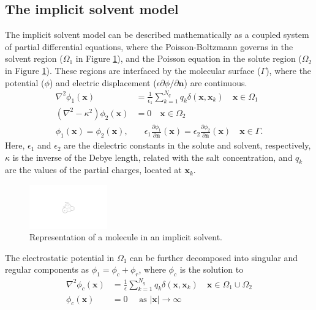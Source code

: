 \subsection*{\sffamily \large The implicit solvent model}

The implicit solvent model\cite{RouxSimonson1999,DecherchiETal2015} can be described mathematically as a coupled system of partial differential equations, where the Poisson-Boltzmann governs in the solvent region ($\Omega_1$ in Figure \ref{fig:implicit_molecule}), and the Poisson equation in the solute region ($\Omega_2$ in Figure \ref{fig:implicit_molecule}). These regions are interfaced by the molecular surface ($\Gamma$), where the potential ($\phi$) and electric displacement ($\epsilon\partial\phi/\partial\mathbf{n}$) are continuous. 
%
\begin{align}\label{eq:pbe}
\nabla^2\phi_1(\mathbf{x}) &= \tfrac{1}{\epsilon_1}\sum_{k=1}^{N_q} q_k\delta(\mathbf{x},\mathbf{x}_k) \quad  \mathbf{x} \in \Omega_1\nonumber\\
\left(\nabla^2 - \kappa^2\right)\phi_2(\mathbf{x})  &= 0 \quad\mathbf{x}\in\Omega_2\nonumber\\
\phi_1(\mathbf{x})  = \phi_2 (\mathbf{x}), &\quad \epsilon_1\frac{\partial\phi_1}{\partial\mathbf{n}}(\mathbf{x})  = \epsilon_2\frac{\partial\phi_2}{\partial\mathbf{n}}(\mathbf{x})  \quad \mathbf{x}\in \Gamma. 
\end{align}
%
Here, $\epsilon_1$ and $\epsilon_2$ are the dielectric constants in the solute and solvent, respectively, $\kappa$ is the inverse of the Debye length, related with the salt concentration, and $q_k$ are the values of the partial charges, located at $\mathbf{x}_k$.

\begin{figure}[h]
\centering
\includegraphics[width=0.3\textwidth]{implicit_molecule.pdf}
\caption{Representation of a molecule in an implicit solvent.}
\label{fig:implicit_molecule}
\end{figure}

The electrostatic potential in $\Omega_1$ can be further decomposed into singular and regular components as $\phi_1 = \phi_c + \phi_r$, where $\phi_c$ is the solution to
%
\begin{align}\label{eq:phic}
\nabla^2\phi_c(\mathbf{x}) &= \tfrac{1}{\epsilon}\sum_{k=1}^{N_q}q_k\delta(\mathbf{x},\mathbf{x}_k) \quad \mathbf{x}\in\Omega_1\cup\Omega_2\nonumber\\
\phi_c(\mathbf{x})&=0 \quad \text{ as } |\mathbf{x}|\to\infty
\end{align}


